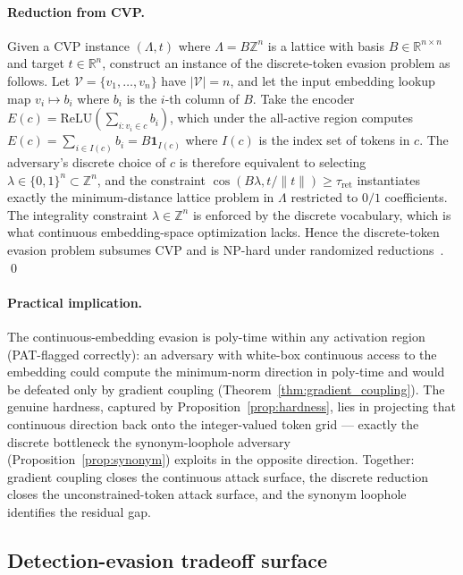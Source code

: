 \documentclass{article}
\theoremstyle{definition}
\newcommand{\RR}{\mathbb{R}}
\newcommand{\cV}{\mathcal{V}}
\newcommand{\enc}{E}
\DeclareMathOperator{\cosim}{cos}
\begin{document}
\paragraph{Reduction from CVP.} Given a CVP instance $(\Lambda, t)$ where $\Lambda = B\mathbb{Z}^n$ is a lattice with basis $B \in \RR^{n \times n}$ and target $t \in \RR^n$, construct an instance of the discrete-token evasion problem as follows. Let $\cV = \{v_1, \ldots, v_n\}$ have $|\cV| = n$, and let the input embedding lookup map $v_i \mapsto b_i$ where $b_i$ is the $i$-th column of $B$. Take the encoder $\enc(c) = \mathrm{ReLU}(\sum_{i:v_i \in c} b_i)$, which under the all-active region computes $\enc(c) = \sum_{i \in I(c)} b_i = B \mathbf{1}_{I(c)}$ where $I(c)$ is the index set of tokens in $c$. The adversary's discrete choice of $c$ is therefore equivalent to selecting $\lambda \in \{0,1\}^n \subset \mathbb{Z}^n$, and the constraint $\cosim(B\lambda, t/\|t\|) \geq \tau_{\text{ret}}$ instantiates exactly the minimum-distance lattice problem in $\Lambda$ restricted to $0/1$ coefficients. The integrality constraint $\lambda \in \mathbb{Z}^n$ is enforced by the discrete vocabulary, which is what continuous embedding-space optimization lacks. Hence the discrete-token evasion problem subsumes CVP and is NP-hard under randomized reductions~\citep{micciancio2001hardness}. \qed

\paragraph{Practical implication.} The continuous-embedding evasion is poly-time within any activation region (PAT-flagged correctly): an adversary with white-box continuous access to the embedding could compute the minimum-norm direction in poly-time and would be defeated only by gradient coupling (Theorem~\ref{thm:gradient_coupling}). The genuine hardness, captured by Proposition~\ref{prop:hardness}, lies in projecting that continuous direction back onto the integer-valued token grid --- exactly the discrete bottleneck the synonym-loophole adversary (Proposition~\ref{prop:synonym}) exploits in the opposite direction. Together: gradient coupling closes the continuous attack surface, the discrete reduction closes the unconstrained-token attack surface, and the synonym loophole identifies the residual gap.

\subsection{Detection-evasion tradeoff surface}
\label{app:tradeoff_surface}
\end{document}
